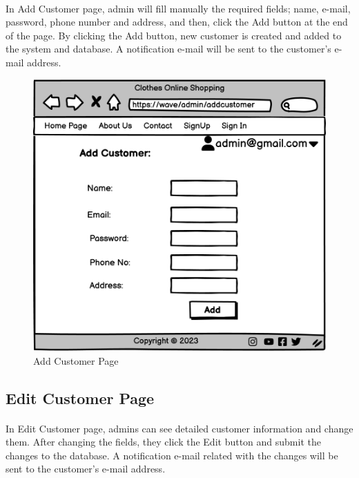 \paragraph{}
In Add Customer page, admin will fill manually the required fields; name, e-mail, password, phone number and address, and then, click the Add button at the end of the page. By clicking the Add button, new customer is created and added to the system and database. A notification e-mail will be sent to the customer's e-mail address. 
\bigskip
\bigskip
\bigskip
\begin{figure}[h]
\centerline{\includegraphics[scale=1.]{images/Add Customer.png}}
\caption{Add Customer Page}
\label{fig}
\end{figure}

\newpage
\subsection{Edit Customer Page}
\bigskip
\paragraph{}
In Edit Customer page, admins can see detailed customer information and change them. After changing the fields, they click the Edit button and submit the changes to the database. A notification e-mail related with the changes will be sent to the customer's e-mail address.  

